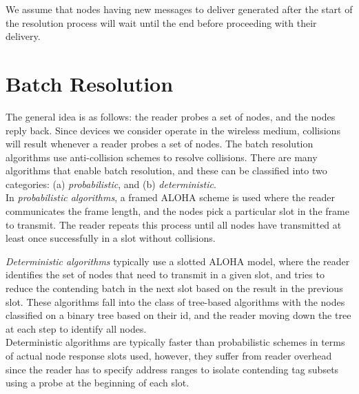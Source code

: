 \documentclass[12pt,a4paper]{report}
\begin{document}
We assume that nodes having new messages to deliver generated after the start of the resolution process will wait until the end before proceeding with their delivery.

\chapter{Batch Resolution}

The general idea is as follows: the reader probes a set of nodes, and the nodes reply back. 
Since devices we consider operate in the wireless medium, collisions will result whenever a reader probes a set of nodes. The batch resolution algorithms use anti-collision schemes to resolve collisions.
There are many algorithms that enable batch resolution, and these can be classified into two categories: (a) \emph{probabilistic}, and (b) \emph{deterministic}.\\

In \emph{probabilistic algorithms}, a framed ALOHA scheme is used where the reader communicates the frame length, and the nodes pick a particular slot in the frame to transmit. The reader repeats this process until all nodes have transmitted at least once successfully in a slot without collisions. 


\emph{Deterministic algorithms} typically use a slotted ALOHA model, where the reader identifies the set of nodes that need to transmit in a given slot, and tries to reduce the contending batch in the next slot based on the result in the previous slot. These algorithms fall into the class of tree-based algorithms with the nodes classified on a binary tree based on their id, and the reader moving down the tree at each step to identify all nodes. \\

Deterministic algorithms are typically faster than probabilistic schemes in terms of actual node response slots used, however, they suffer from reader overhead since the reader has to specify address ranges to isolate contending tag subsets using a probe at the beginning of each slot.
\end{document}
